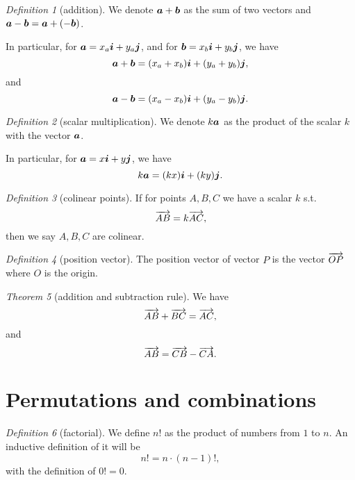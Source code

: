 \documentclass[8pt]{article}
\theoremstyle{remark}
\newtheorem{theorem}{Theorem}[section]
\newtheorem{definition}[theorem]{Definition}
\begin{document}
        \begin{definition}[addition]
            We denote $\boldsymbol{a} + \boldsymbol{b}$ as the sum of two vectors and $\boldsymbol{a} - \boldsymbol{b} = \boldsymbol{a} + (-\boldsymbol{b})$.

            In particular, for $\boldsymbol{a} = x_a\boldsymbol{i} + y_a\boldsymbol{j}$, and for $\boldsymbol{b} = x_b \boldsymbol{i} + y_b \boldsymbol{j}$, we have
            $$
                \boldsymbol{a} + \boldsymbol{b} = (x_a + x_b) \boldsymbol{i} + (y_a + y_b) \boldsymbol{j},
            $$
            and
            $$
                \boldsymbol{a} - \boldsymbol{b} = (x_a - x_b) \boldsymbol{i} + (y_a - y_b) \boldsymbol{j}.
            $$
        \end{definition}

        \begin{definition}[scalar multiplication]
            We denote $k\boldsymbol{a}$ as the product of the scalar $k$ with the vector $\boldsymbol{a}$.

            In particular, for $\boldsymbol{a} = x \boldsymbol{i} + y \boldsymbol{j}$, we have
            $$
                k\boldsymbol{a} = (kx) \boldsymbol{i} + (ky) \boldsymbol{j}.
            $$
        \end{definition}

        \begin{definition}[colinear points]
            If for points $A, B, C$ we have a scalar $k$ s.t.
            $$
                \overrightarrow{AB} = k \overrightarrow{AC},
            $$
            then we say $A, B, C$ are colinear.
        \end{definition}

        \begin{definition}[position vector]
            The position vector of vector $P$ is the vector $\overrightarrow{OP}$ where $O$ is the origin.
        \end{definition}

        \begin{theorem}[addition and subtraction rule]
            We have
            $$
                \overrightarrow{AB} + \overrightarrow{BC} = \overrightarrow{AC},
            $$
            and
            $$
                \overrightarrow{AB} = \overrightarrow{CB} - \overrightarrow{CA}.
            $$
        \end{theorem}

    \section{Permutations and combinations}

        \begin{definition}[factorial]
            We define $n!$ as the product of numbers from $1$ to $n$. An inductive definition of it will be
            $$
                n! = n \cdot (n-1)!,
            $$
            with the definition of $0! = 0$.
        \end{definition}
\end{document}

